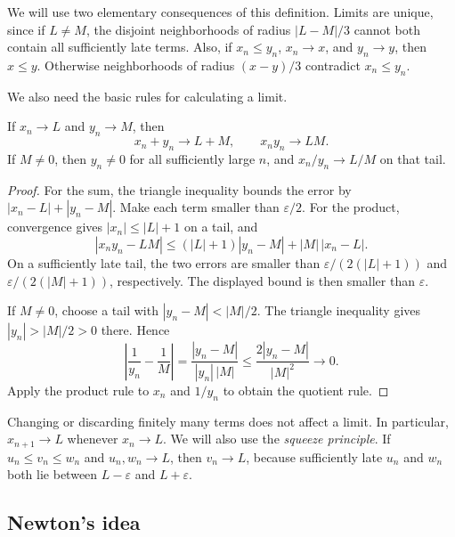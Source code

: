 We will use two elementary consequences of this definition. Limits are
unique, since if $L\ne M$, the disjoint neighborhoods of radius
$|L-M|/3$ cannot both contain all sufficiently late terms. Also, if
$x_n\leq y_n$, $x_n\to x$, and $y_n\to y$, then $x\leq y$.
Otherwise neighborhoods of radius $(x-y)/3$ contradict $x_n\leq y_n$.

We also need the basic rules for calculating a limit.
\begin{proposition}
  \label{thm:analysis-i:limit-laws}
  If $x_n\to L$ and $y_n\to M$, then
  \[
    x_n+y_n\to L+M,\qquad x_ny_n\to LM.
  \]
  If $M\ne0$, then $y_n\ne0$ for all sufficiently large $n$, and
  $x_n/y_n\to L/M$ on that tail.
\end{proposition}
\begin{proof}
  For the sum, the triangle inequality bounds the error by
  $|x_n-L|+|y_n-M|$. Make each term smaller than $\varepsilon/2$.
  For the product, convergence gives $|x_n|\leq|L|+1$ on a tail, and
  \[
    |x_ny_n-LM|
      \leq (|L|+1)|y_n-M|+|M|\,|x_n-L|.
  \]
  On a sufficiently late tail, the two errors are smaller than
  $\varepsilon/(2(|L|+1))$ and $\varepsilon/(2(|M|+1))$, respectively.
  The displayed bound is then smaller than $\varepsilon$.

  If $M\ne0$, choose a tail with $|y_n-M|<|M|/2$.
  The triangle inequality gives $|y_n|>|M|/2>0$ there. Hence
  \[
    \left|\frac1{y_n}-\frac1M\right|
      =\frac{|y_n-M|}{|y_n|\,|M|}
      \leq\frac{2|y_n-M|}{|M|^2}\longrightarrow0.
  \]
  Apply the product rule to $x_n$ and $1/y_n$ to obtain the quotient rule.
\end{proof}
Changing or discarding finitely many terms does not affect a limit.
In particular, $x_{n+1}\to L$ whenever $x_n\to L$.
We will also use the \emph{squeeze principle}. If
$u_n\leq v_n\leq w_n$ and $u_n,w_n\to L$, then $v_n\to L$,
because sufficiently late $u_n$ and $w_n$ both lie between
$L-\varepsilon$ and $L+\varepsilon$.

\subsection{Newton's idea}

